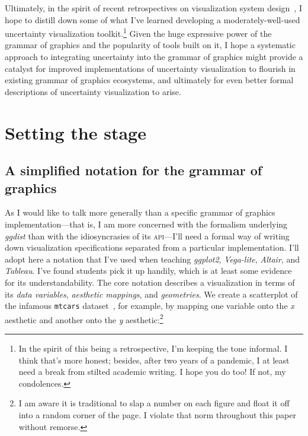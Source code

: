 \documentclass[journal]{vgtc}                     %
\begin{document}
Ultimately, in the spirit of recent retrospectives on visualization system design~\cite{satyanarayan2019critical}, I hope to distill down some of what I've learned developing a moderately-well-used uncertainty visualization toolkit.\footnote{In the spirit of this being a retrospective, I'm keeping the tone informal. I think that's more honest; besides, after two years of a pandemic, I at least need a break from stilted academic writing. I hope you do too! If not, my condolences.} 
Given the huge expressive power of the grammar of graphics and the popularity of tools built on it, I hope a systematic approach to integrating uncertainty into the grammar of graphics might provide a catalyst for improved implementations of uncertainty visualization to flourish in existing grammar of graphics ecosystems, and ultimately for even better formal descriptions of uncertainty visualization to arise. 

\section{Setting the stage}

\subsection{A simplified notation for the grammar of graphics}

As I would like to talk more generally than a specific grammar of graphics implementation---that is, I am more concerned with the formalism underlying \textit{ggdist} than with the idiosyncrasies of its \textsc{api}---I'll need a formal way of writing down visualization specifications separated from a particular implementation. I'll adopt here a notation that I've used
when teaching \textit{ggplot2}, \textit{Vega-lite}, \textit{Altair}, and \textit{Tableau}. I've found students pick it up handily, which is at least some evidence for its understandability. The core notation describes a visualization in terms of its \textit{data variables}, \textit{aesthetic mappings}, and \textit{geometries}. We create a scatterplot of the infamous \texttt{mtcars} dataset~\cite{henderson1981building}, for example, by mapping one variable onto the \textit{x} aesthetic and another onto the \textit{y} aesthetic:\footnote{I am aware it is traditional to slap a number on each figure and float it off into a random corner of the page. I violate that norm throughout this paper without remorse.}
\end{document}
